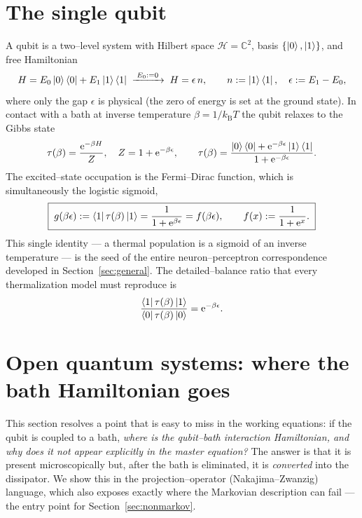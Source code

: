 \documentclass[11pt,a4paper]{article}
\theoremstyle{plain}
\theoremstyle{definition}
\theoremstyle{remark}
\newcommand{\ee}{\mathrm{e}}
\newcommand{\kB}{k_{\mathrm{B}}}
\newcommand{\calH}{\mathcal{H}}
\newcommand{\bbC}{\mathbb{C}}
\begin{document}
\section{The single qubit}
\label{sec:single-qubit}
A qubit is a two--level system with Hilbert space $\calH=\bbC^2$, basis
$\{\ket{0},\ket{1}\}$, and free Hamiltonian
\begin{equation}
H = E_0\ket{0}\bra{0}+E_1\ket{1}\bra{1}
\;\xrightarrow{\;E_0:=0\;}\;
H=\epsilon\,n,\qquad n:=\ket{1}\bra{1},\quad \epsilon:=E_1-E_0,
\label{eq:H-single}
\end{equation}
where only the gap $\epsilon$ is physical (the zero of energy is set at
the ground state). In contact with a bath at inverse temperature
$\beta=1/\kB T$ the qubit relaxes to the Gibbs state
\begin{equation}
\tau(\beta)=\frac{\ee^{-\beta H}}{Z},\quad Z=1+\ee^{-\beta\epsilon},
\qquad
\tau(\beta)=\frac{\ket{0}\bra{0}+\ee^{-\beta\epsilon}\ket{1}\bra{1}}
{1+\ee^{-\beta\epsilon}} .
\label{eq:gibbs}
\end{equation}
The excited--state occupation is the Fermi--Dirac function, which is
simultaneously the logistic sigmoid,
\begin{equation}
\boxed{\;
g(\beta\epsilon):=\bra{1}\tau(\beta)\ket{1}
=\frac{1}{1+\ee^{\beta\epsilon}} = f(\beta\epsilon),\qquad
f(x):=\frac{1}{1+\ee^{x}} .\;}
\label{eq:fermi}
\end{equation}
This single identity --- a thermal population is a sigmoid of an inverse
temperature --- is the seed of the entire neuron--perceptron
correspondence developed in Section~\ref{sec:general}. The
detailed--balance ratio that every thermalization model must reproduce
is
\begin{equation}
\frac{\bra{1}\tau(\beta)\ket{1}}{\bra{0}\tau(\beta)\ket{0}}
=\ee^{-\beta\epsilon}.
\label{eq:db-ratio}
\end{equation}

\section{Open quantum systems: where the bath Hamiltonian goes}
\label{sec:open}
This section resolves a point that is easy to miss in the working
equations: if the qubit is coupled to a bath, \emph{where is the
qubit--bath interaction Hamiltonian, and why does it not appear
explicitly in the master equation?} The answer is that it is present
microscopically but, after the bath is eliminated, it is \emph{converted}
into the dissipator. We show this in the projection--operator
(Nakajima--Zwanzig) language, which also exposes exactly where the
Markovian description can fail --- the entry point for
Section~\ref{sec:nonmarkov}.
\end{document}
